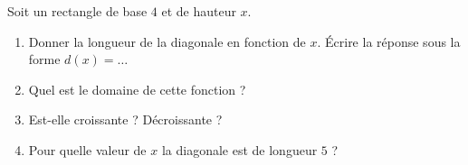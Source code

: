 
\begin{exercice}\label{exoSeconde-0076}

Soit un rectangle de base \( 4\) et de hauteur \( x\).
\begin{multicols}{2}
    \begin{enumerate}
        \item
            Donner la longueur de la diagonale en fonction de \( x\). Écrire la réponse sous la forme \( d(x)=\ldots\)
        \item
            Quel est le domaine de cette fonction ?
        \item
            Est-elle croissante ? Décroissante ?
        \item
            Pour quelle valeur de \( x\) la diagonale est de longueur \( 5\) ?
    \end{enumerate}
\end{multicols}


\end{exercice}
